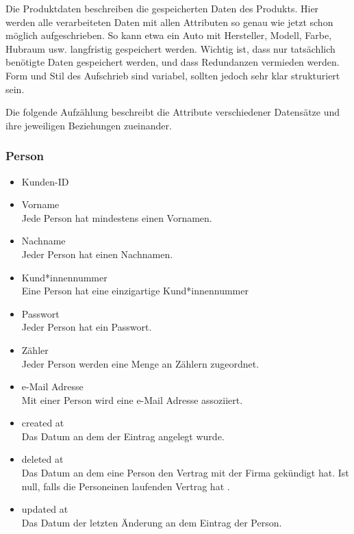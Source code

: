 \begin{tcolorbox}
Die Produktdaten beschreiben die gespeicherten Daten des Produkts. 
Hier werden alle verarbeiteten Daten mit allen Attributen so genau wie jetzt schon möglich aufgeschrieben.
So kann etwa ein Auto mit Hersteller, Modell, Farbe, Hubraum usw. langfristig gespeichert werden.
Wichtig ist, dass nur tatsächlich benötigte Daten gespeichert werden, und dass Redundanzen vermieden werden.
Form und Stil des Aufschrieb sind variabel, sollten jedoch sehr klar strukturiert sein.
\end{tcolorbox}
Die folgende Aufzählung beschreibt die Attribute verschiedener Datensätze und ihre jeweiligen Beziehungen zueinander.

\subsubsection*{Person}
	\begin{itemize}
	    \item Kunden-ID 
  		\item Vorname \hfill \\
  		Jede Person hat mindestens einen Vornamen.
 		\item Nachname\hfill \\
 		Jeder Person hat einen Nachnamen.
 		\item Kund*innennummer\hfill \\
 		Eine Person hat eine einzigartige Kund*innennummer
 		\item Passwort \hfill \\
 		Jeder Person hat ein Passwort.
		\item Zähler\hfill \\
		Jeder Person werden eine Menge an Zählern zugeordnet.
		\item e-Mail Adresse\hfill \\
		Mit einer Person wird eine e-Mail Adresse assoziiert.
		\item created at\hfill \\
		Das Datum an dem der Eintrag angelegt wurde.
		\item deleted at\hfill \\
		Das Datum an dem eine Person den Vertrag mit der Firma gekündigt hat. Ist null, falls die Personeinen laufenden Vertrag hat .
		\item updated at\hfill \\
		Das Datum der letzten Änderung an dem Eintrag der Person.
	\end{itemize}
